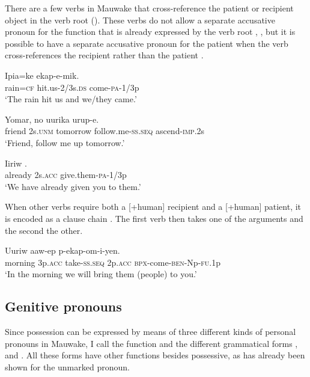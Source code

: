 There are a few verbs in Mauwake that cross-reference the patient or recipient object in the verb root (). These verbs do not allow a separate accusative pronoun for the function that is already expressed by the verb root , , but it is possible to have a separate accusative pronoun for the patient when the verb cross-references the recipient rather than the patient .

\ea%
\label{ex:3:x564}
\gll Ipia=ke  ekap-e-mik. \\
rain=\textsc{cf} hit.us-2/3s.\textsc{ds} come-\textsc{pa}-1/3p\\
\glt`The rain hit us and we/they came.'
\z

\ea%
\label{ex:3:x1526}
\gll Yomar, no uurika \textstyleEmphasizedVernacularWords{-} urup-e. \\
friend 2s.\textsc{unm} tomorrow follow.me-\textsc{ss}.\textsc{seq} ascend-\textsc{imp}.2s\\
\glt`Friend, follow me up tomorrow.'
\z

\ea%
\label{ex:3:x565}
\gll Iiriw  . \\
already 2s.\textsc{acc} give.them-\textsc{pa}-1/3p\\
\glt`We have already given you to them.'
\z

When other verbs require both a [+human] recipient and a [+human] patient, it is encoded as a clause chain . The first verb then takes one of the arguments and the second the other.

\ea%
\label{ex:3:x566}
\gll Uuriw  aaw-ep  p-ekap-om-i-yen. \\
morning 3p.\textsc{acc} take-\textsc{ss}.\textsc{seq} 2p.\textsc{acc} \textsc{bpx}-come-\textsc{ben}-Np-\textsc{fu}.1p\\
\glt`In the morning we will bring them (people) to you.'
\z

\subsection{Genitive pronouns}\label{sec:3.5.4}
{}
Since possession can be expressed by means of three different kinds of personal pronouns in Mauwake, I call the function  and the different grammatical forms , \textstyleDefinedWords{} and . All these forms have other functions besides possessive, as has already been shown for the unmarked pronoun. 


